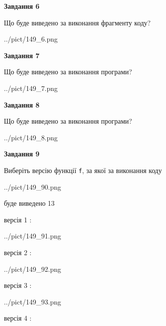 \documentclass[12pt, ukrainian]{article}
\def\code#1{\Verb!#1!}
\begin{document}
{\begin {large}
{\begin {center}\textbf{Завдання 6}\end {center}}

Що буде виведено за виконання фрагменту коду?\par
\begin{center}
	{../pict/149_6.png}
\end{center}
\newpage

{\begin {center}\textbf{Завдання 7}\end {center}}

Що буде виведено за виконання програми?\par
\begin{center}
	{../pict/149_7.png}
\end{center}
\newpage

{\begin {center}\textbf{Завдання 8}\end {center}}

Що буде виведено за виконання програми?\par
\begin{center}
	{../pict/149_8.png}
\end{center}
\newpage

{\begin {center}\textbf{Завдання 9}\end {center}}

Виберіть версію функції \code{f}, за якої за виконання коду
\begin{center}
	{../pict/149_90.png}
\end{center}
буде виведено 13

\vspace{5mm}
версія 1 :

\begin{center}
	{../pict/149_91.png}
\end{center}
версія 2 :

\begin{center}
	{../pict/149_92.png}
\end{center}
версія 3 :

\begin{center}
	{../pict/149_93.png}
\end{center}
версія 4 :


\end{large}}
\end{document}
